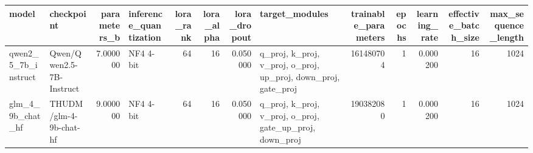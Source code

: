 \begin{tabular}{llrlrrrlrrrrr}
\toprule
model & checkpoint & parameters_b & inference_quantization & lora_rank & lora_alpha & lora_dropout & target_modules & trainable_parameters & epochs & learning_rate & effective_batch_size & max_sequence_length \\
\midrule
qwen2_5_7b_instruct & Qwen/Qwen2.5-7B-Instruct & 7.000000 & NF4 4-bit & 64 & 16 & 0.050000 & q_proj, k_proj, v_proj, o_proj, up_proj, down_proj, gate_proj & 161480704 & 1 & 0.000200 & 16 & 1024 \\
glm_4_9b_chat_hf & THUDM/glm-4-9b-chat-hf & 9.000000 & NF4 4-bit & 64 & 16 & 0.050000 & q_proj, k_proj, v_proj, o_proj, gate_up_proj, down_proj & 190382080 & 1 & 0.000200 & 16 & 1024 \\
\bottomrule
\end{tabular}
